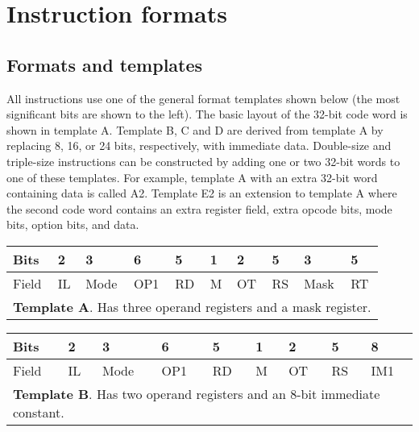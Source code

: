 \documentclass[forwardcom.tex]{subfiles}
\begin{document}
\RaggedRight

\chapter{Instruction formats}
\section{Formats and templates}
All instructions use one of the general format templates shown below (the most significant bits are shown to the left). The basic layout of the 32-bit code word is shown in template A. Template B, C and D are derived from template A by replacing 8, 16, or 24 bits, respectively, with immediate data. Double-size and triple-size instructions can be constructed by adding one or two 32-bit words to one of these templates. For example, template A with an extra 32-bit word containing data is called A2. Template E2 is an extension to template A where the second code word contains an extra register field, extra opcode bits, mode bits, option bits, and data.
\vspace{4mm}

\begin{table}[h!] \label{table:templateA}
\begin{tabular}{|p{10mm}|p{10mm}|p{10mm}|p{10mm}|p{10mm}|p{10mm}|p{10mm}|p{10mm}|p{10mm}|p{10mm}|} \hline
 Bits & 2 & 3 & 6 & 5 & 1 & 2 & 5 & 3 & 5 \\ \hline
Field & IL & Mode & OP1 & RD & M & OT & RS & Mask & RT  \\ \hline
\multicolumn{10}{|l|}{
\textbf{Template A}. Has three operand registers and a mask register.} \\ \hline
\end{tabular}
\end{table}
\vv

\begin{table}[h!] \label{table:templateB}
\vv
\begin{tabular}{|p{10mm}|p{10mm}|p{10mm}|p{10mm}|p{10mm}|p{10mm}|p{10mm}|p{10mm}|p{24mm}|} \hline
 Bits & 2 & 3 & 6 & 5 & 1 & 2 & 5 & 8 \\ \hline
Field & IL & Mode & OP1 & RD & M & OT & RS & IM1 \\ \hline
\multicolumn{9}{|l|}{
\textbf{Template B}. Has two operand registers and an 8-bit immediate constant.} \\ \hline
\end{tabular}
\end{table}
\vv
\end{document}
